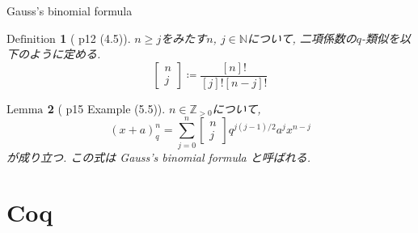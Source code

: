 \documentclass[dvipdfmx,cjk]{beamer}
\theoremstyle{mystyle}
\newtheorem{df}{$\textrm{Definition}$}[section]
\newtheorem{lem}[df]{$\textrm{Lemma}$}
\newcommand{\bpf}{\begin{proof}}
\newcommand{\epf}{\end{proof}}
\newcommand{\N}{\mathbb{N}}
\newcommand{\Z}{\mathbb{Z}}
\newcommand{\qcoe}[2]{\left[\begin{array}{ccc}#1\\#2\end{array}\right]}
\newcommand{\0}{\textbf{0}}
\begin{document}
\begin{frame}{Gauss's binomial formula}
	\begin{df}[\cite{Kac} p12 (4.5)]
		$n \ge j$をみたす$n$, $j \in \N$について, 二項係数の$q$-類似を以下のように定める. 
		\[
			\qcoe{n}{j} \coloneqq \frac{[n]!}{[j]![n - j]!}
		\]
	\end{df} \pause
   \begin{lem}[\cite{Kac} p15 Example (5.5)]
	  $n \in \Z_{>0}$について, 
	  \[
	    (x + a)^n_q = \sum_{j = 0}^n \qcoe{n}{j} q^{j (j - 1)/2} a^j x^{n - j}
	  \]
	  が成り立つ. この式は Gauss's binomial formula と呼ばれる. 
	\end{lem}
\end{frame}
\section{Coq}

\begin{frame}
  \tableofcontents[currentsection] 
\end{frame}

\end{document}
